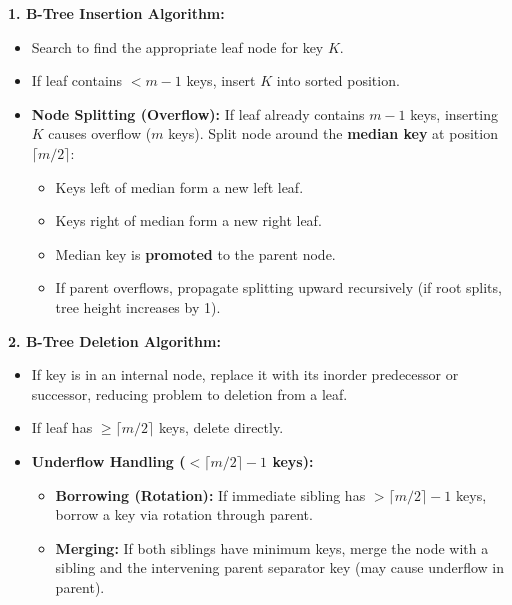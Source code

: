 \documentclass[12pt,a4paper]{article}
\begin{document}
\begin{tcolorbox}[formulabox, title={\textbf{B-Tree Algorithmic Operations: Insertion and Deletion}}]
\textbf{1. B-Tree Insertion Algorithm:}
\begin{itemize}[leftmargin=*, nosep]
  \item Search to find the appropriate leaf node for key $K$.
  \item If leaf contains $< m - 1$ keys, insert $K$ into sorted position.
  \item \textbf{Node Splitting (Overflow):} If leaf already contains $m - 1$ keys, inserting $K$ causes overflow ($m$ keys). Split node around the \textbf{median key} at position $\lceil m/2 \rceil$:
  \begin{itemize}[leftmargin=*, nosep]
    \item Keys left of median form a new left leaf.
    \item Keys right of median form a new right leaf.
    \item Median key is \textbf{promoted} to the parent node.
    \item If parent overflows, propagate splitting upward recursively (if root splits, tree height increases by 1).
  \end{itemize}
\end{itemize}

\par\vspace{2pt}\noindent
\textbf{2. B-Tree Deletion Algorithm:}
\begin{itemize}[leftmargin=*, nosep]
  \item If key is in an internal node, replace it with its inorder predecessor or successor, reducing problem to deletion from a leaf.
  \item If leaf has $\ge \lceil m/2 \rceil$ keys, delete directly.
  \item \textbf{Underflow Handling ($< \lceil m/2 \rceil - 1$ keys):}
  \begin{itemize}[leftmargin=*, nosep]
    \item \textbf{Borrowing (Rotation):} If immediate sibling has $> \lceil m/2 \rceil - 1$ keys, borrow a key via rotation through parent.
    \item \textbf{Merging:} If both siblings have minimum keys, merge the node with a sibling and the intervening parent separator key (may cause underflow in parent).
  \end{itemize}
\end{itemize}
\end{tcolorbox}
\end{document}
